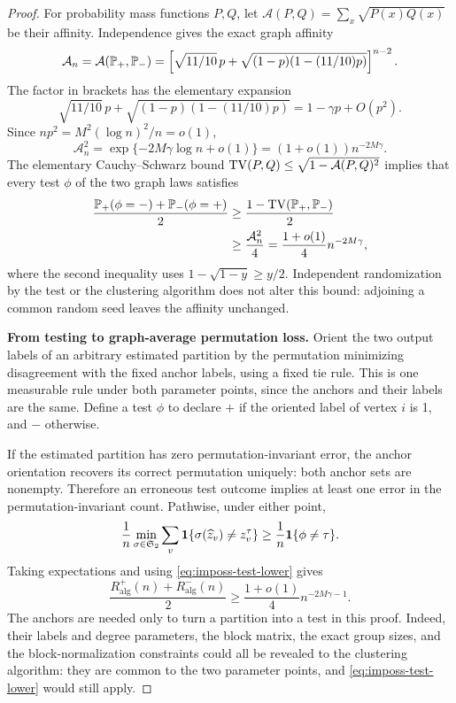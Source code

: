 \begin{proof}
For probability mass functions \(P,Q\), let
\(\mathcal A(P,Q)=\sum_x\sqrt{P(x)Q(x)}\) be their affinity. Independence
gives the exact graph affinity
\begin{equation}
 \mathcal A_n
 =\mathcal A(\mathbb P_+,\mathbb P_-)
 =\left[
     \sqrt{11/10}\,p+
       \sqrt{(1-p)(1-(11/10)p)}
   \right]^{n-2}.
 \label{eq:imposs-affinity}
\end{equation}
The factor in brackets has the elementary expansion
\[
 \sqrt{11/10}\,p+
       \sqrt{(1-p)(1-(11/10)p)}
 =1-\gamma p+O(p^2).
\]
Since \(np^2=M^2(\log n)^2/n=o(1)\),
\begin{equation}
 \mathcal A_n^2
   =\exp\{-2M\gamma\log n+o(1)\}
   =(1+o(1))n^{-2M\gamma}.
 \label{eq:imposs-affinity-rate}
\end{equation}
The elementary Cauchy--Schwarz bound
\(\operatorname{TV}(P,Q)\le\sqrt{1-\mathcal A(P,Q)^2}\) implies that every test \(\phi\)
of the two graph laws satisfies
\begin{align}
 \frac{\mathbb P_+(\phi=-)+\mathbb P_-(\phi=+)}2
 &\ge \frac{1-\operatorname{TV}(\mathbb P_+,\mathbb P_-)}2 \\
 &\ge \frac{\mathcal A_n^2}{4}
  =\frac{1+o(1)}4 n^{-2M\gamma},
 \label{eq:imposs-test-lower}
\end{align}
where the second inequality uses
\(1-\sqrt{1-y}\ge y/2\). Independent randomization by the test or the
clustering algorithm does not alter this bound: adjoining a common random
seed leaves the affinity unchanged.

\medskip
\textbf{From testing to graph-average permutation loss.}
Orient the two output labels of an arbitrary estimated partition by the
permutation minimizing disagreement with the fixed anchor labels, using
a fixed tie rule. This is one measurable rule under both parameter points,
since the anchors and their labels are the same. Define a test \(\phi\) to
declare \(+\) if the oriented label of vertex \(i\) is 1, and \(-\)
otherwise.

If the estimated partition has zero permutation-invariant error, the
anchor orientation recovers its correct permutation uniquely: both anchor
sets are nonempty. Therefore an erroneous test outcome implies at least
one error in the permutation-invariant count. Pathwise, under either point,
\begin{equation}
 \frac1n\min_{\sigma\in\mathfrak S_2}
       \sum_v\mathbf1\{\sigma(\widehat z_v)\ne z_v^\tau\}
 \ge\frac1n\mathbf1\{\phi\ne\tau\}.
 \label{eq:imposs-orientation}
\end{equation}
Taking expectations and using \eqref{eq:imposs-test-lower} gives
\begin{equation}
 \frac{R_{\mathrm{alg}}^+(n)+R_{\mathrm{alg}}^-(n)}2
 \ge\frac{1+o(1)}4 n^{-2M\gamma-1}.
 \label{eq:imposs-graph-risk-lower}
\end{equation}
The anchors are needed only to turn a partition into a test in this proof.
Indeed, their labels and degree parameters, the block matrix, the exact
group sizes, and the block-normalization constraints could all be revealed
to the clustering algorithm: they are common to the two parameter points,
and \eqref{eq:imposs-test-lower} would still apply.


\end{proof}
